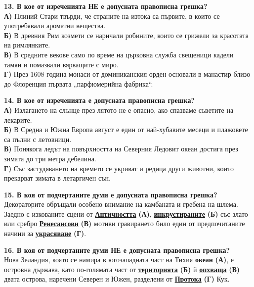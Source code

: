 \documentclass[12pt,a4paper]{article}
\begin{document}
\vspace{0.6cm}

\noindent
\textbf{13. В кое от изреченията НЕ е допусната правописна грешка?} \\
\noindent
\textbf{А)} Плиний Стари твърди, че страните на изтока са първите, в които се употребявали ароматни вещества. \\
\textbf{Б)} В древния Рим козмети се наричали робините, които се грижели за красотата на римлянките. \\
\textbf{В)} В средните векове само по време на църковна служба свещеници кадели тамян и помазвали вярващите с миро. \\
\textbf{Г)} През 1608 година монаси от доминиканския орден основали в манастир близо до Флоренция първата „парфюмерийна фабрика“.

\vspace{0.6cm}

\noindent
\textbf{14. В кое от изреченията е допусната правописна грешка?} \\
\noindent
\textbf{А)} Излагането на слънце през лятото не е опасно, ако спазваме съветите на лекарите. \\
\textbf{Б)} В Средна и Южна Европа август е един от най-хубавите месеци и плажовете са пълни с летовници. \\
\textbf{В)} Понякога ледът на повърхността на Северния Ледовит океан достига през зимата до три метра дебелина. \\
\textbf{Г)} Със застудяването на времето се укриват и редица други животни, които прекарват зимата в летаргичен сън.

\vspace{0.6cm}

\noindent
\textbf{15. В коя от подчертаните думи е допусната правописна грешка?} \\
\noindent
Декораторите обръщали особено внимание на камбаната и гребена на шлема. Заедно с изкованите сцени от \underline{\textbf{Античността}} \textbf{(А)}, \underline{\textbf{инкрустираните}} \textbf{(Б)} със злато или сребро \underline{\textbf{Ренесансови}} \textbf{(В)} мотиви гравирането било един от предпочитаните начини за \underline{\textbf{украсяване}} \textbf{(Г)}.

\vspace{0.6cm}

\noindent
\textbf{16. В коя от подчертаните думи НЕ е допусната правописна грешка?} \\
\noindent
Нова Зеландия, която се намира в югозападната част на Тихия \underline{\textbf{океан}} \textbf{(А)}, е островна държава, като по-голямата част от \underline{\textbf{територията}} \textbf{(Б)} й \underline{\textbf{опхваща}} \textbf{(В)} двата острова, наречени Северен и Южен, разделени от \underline{\textbf{Протока}} \textbf{(Г)} Кук.
\end{document}
